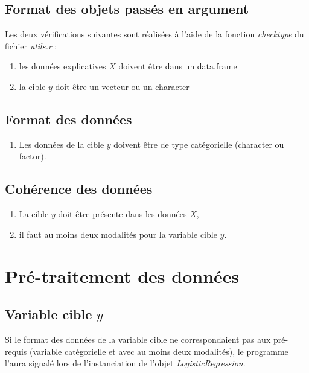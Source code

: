 \documentclass[10pt,french]{report}
\begin{document}
	\subsection{Format des objets passés en argument}

	Les deux vérifications suivantes sont réalisées à l'aide de la fonction \textit{check\textunderscore type} du fichier \textit{utils.r} :

	\begin{enumerate}
		\item les données explicatives $X$ doivent être dans un data.frame
		\item la cible $y$ doit être un vecteur ou un character
	\end{enumerate}

	\subsection{Format des données}

	\begin{enumerate}
		\item Les données de la cible $y$ doivent être de type catégorielle (character ou factor).
	\end{enumerate}

	\subsection{Cohérence des données}

	\begin{enumerate}
		\item La cible $y$ doit être présente dans les données $X$,
		\item il faut au moins deux modalités pour la variable cible $y$.
	\end{enumerate}

	\section{Pré-traitement des données}

	\subsection{Variable cible $y$}

	Si le format des données de la variable cible ne correspondaient pas aux pré-requis (variable catégorielle et avec au moins deux modalités), le programme l'aura signalé lors de l'instanciation de l'objet \textit{LogisticRegression}.
\end{document}
